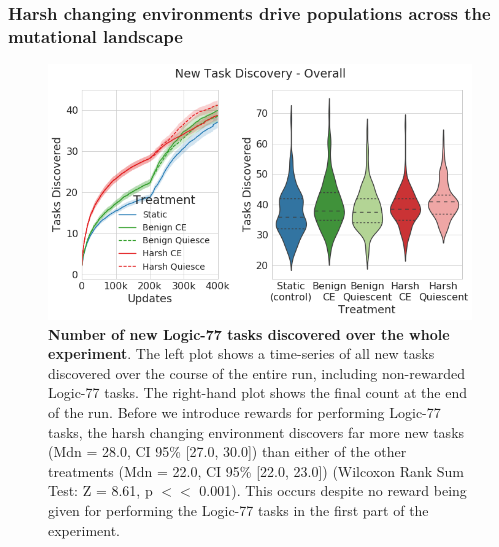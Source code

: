 \documentclass[10pt,letterpaper]{article}
\begin{document}
\subsubsection*{Harsh changing environments drive populations across the mutational landscape}
	\begin{figure}[!h]
	\includegraphics[width=0.95\columnwidth]{figures/LTE/lte-simple-overall_task_discovery.png}
	\caption{\textbf{Number of new Logic-77 tasks discovered over the whole experiment}. The left plot shows a time-series of all new tasks discovered over the course of the entire run, including non-rewarded Logic-77 tasks. The right-hand plot shows the final count at the end of the run. Before we introduce rewards for performing Logic-77 tasks, the harsh changing environment discovers far more new tasks (Mdn = 28.0, CI 95\% [27.0, 30.0]) than either of the other treatments (Mdn = 22.0, CI 95\% [22.0, 23.0]) (Wilcoxon Rank Sum Test: Z = 8.61, p $<<$ 0.001). This occurs despite no reward being given for performing the Logic-77 tasks in the first part of the experiment. %
	}
	\label{fig:simple-overall_task_discovery}
	\end{figure}
\end{document}
